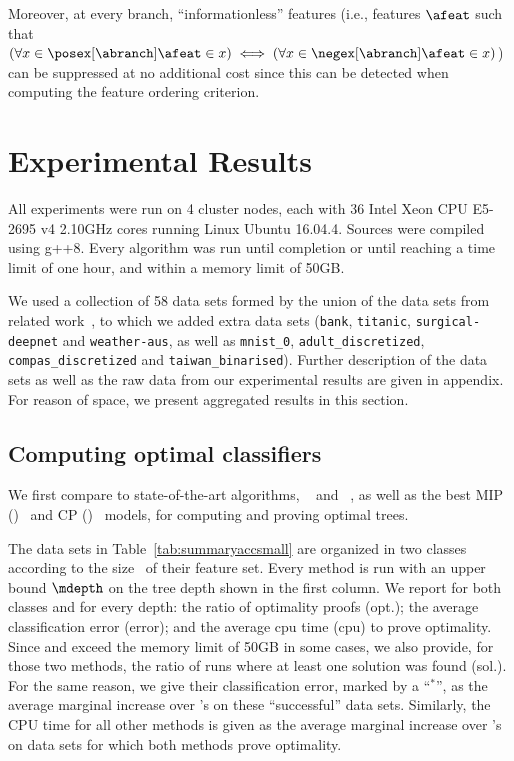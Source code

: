 \documentclass{article}
\begin{document}
Moreover, at every branch, ``informationless'' features (i.e., features $\afeat$ such that $(\forall x \in \posex[\abranch] \afeat \in x) \iff (\forall x \in \negex[\abranch] \afeat \in x)$) can be suppressed at no additional cost since this can be detected when computing the feature ordering criterion.




\section{Experimental Results}
\label{sec:exp}

All experiments were run
on 4 cluster nodes, each with 36 Intel Xeon CPU E5-2695 v4 2.10GHz cores
running Linux Ubuntu 16.04.4. Sources were compiled using g++8. 
Every algorithm was run until completion or until reaching a time limit of one hour, and within a memory limit of 50GB.


We used a collection of 58 data sets formed by the union of the data sets from related work~\cite{narodytska2018learning,dl85,verwer2019learning}, to which we added extra data sets (\texttt{bank}, \texttt{titanic}, \texttt{surgical-deepnet} and \texttt{weather-aus}, as well as \texttt{mnist\_0}, \texttt{adult\_discretized}, \texttt{compas\_discretized} and \texttt{taiwan\_binarised}). Further description of the data sets as well as the raw data from our experimental results are given in appendix. For reason of space, we present aggregated results in this section.



\subsection{Computing optimal classifiers}

We first compare \budalg to state-of-the-art algorithms, \murtree~\cite{DBLP:journals/corr/abs-2007-12652} and \dleight~\cite{dl85}, as well as the best MIP (\binoct)~\cite{verwer2019learning} and CP (\cp)~\cite{verhaeghe2019learning} models, for computing and proving optimal trees. 

The data sets in Table~\ref{tab:summaryaccsmall} are organized 
in two classes according to
the size \numfeat\ of their feature set.
Every method is run with an upper bound $\mdepth$ on the tree depth shown in the first column. 
We report for both classes and for every depth: the ratio of optimality proofs (opt.); the average classification error (error); and %
 the average cpu time (cpu) to prove optimality.
Since \dleight and \binoct exceed the memory limit of 50GB in some cases, we also provide, for those two methods, the ratio of runs where at least one solution was found (sol.). For the same reason, we give their classification error, marked by a ``$^*$'', as the average marginal increase over \budalg's on these ``successful'' data sets. 
Similarly, the CPU time for all other methods is given as the average marginal increase over \budalg's on data sets for which both methods prove optimality.
\end{document}
